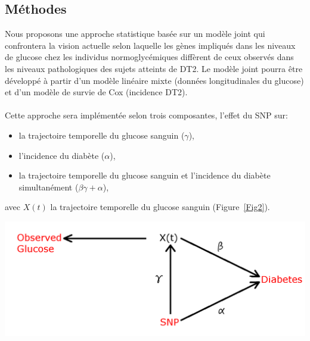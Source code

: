 \documentclass[a0,portrait]{a0poster}
\begin{document}
\begin{multicols}{2}
\section*{Méthodes}
Nous proposons une approche statistique basée sur un modèle joint \cite{tsiatis2004} qui confrontera la vision actuelle selon laquelle les gènes impliqués dans les niveaux de glucose chez les individus normoglycémiques diffèrent de ceux observés dans les niveaux pathologiques des sujets atteints de DT2.
Le modèle joint pourra être développé à partir d'un modèle linéaire mixte (données longitudinales du glucose) et d'un modèle de survie de Cox (incidence DT2).
\\
\\
Cette approche sera implémentée selon trois composantes, l'effet du SNP sur:
\begin{itemize}
\item la trajectoire temporelle du glucose sanguin ($\gamma $),
\item l'incidence du diabète ($\alpha $),
\item la trajectoire temporelle du glucose sanguin et l'incidence du diabète simultanément ($\beta\gamma+\alpha $),
\end{itemize}
\vspace{1cm}
avec $X(t)$ la trajectoire temporelle du glucose sanguin (Figure~\ref{Fig2}).
\begin{center}\vspace{2cm}
\includegraphics[width=0.8\linewidth]{jointModel.png}
\label{Fig2}
\end{center}%



\end{multicols}
\end{document}

